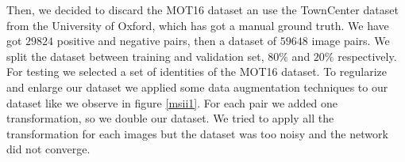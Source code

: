 Then, we decided to discard the MOT16 dataset an use the TownCenter dataset \cite{townCenter} from the University of Oxford, which has got a manual ground truth. We have got $29824$ positive and negative pairs, then a dataset of $59648$ image pairs. We split the dataset between training and validation set, $80 \%$ and $20 \%$ respectively. For testing we selected a set of identities of the MOT16 dataset. To regularize and enlarge our dataset we applied some data augmentation techniques to our dataset like we observe in figure \ref{msii1}. For each pair we added one transformation, so we double our dataset. We tried to apply all the transformation for each images but the dataset was too noisy and the network did not converge.






\begin{figure}[H]
		
\centering


\end{figure}
